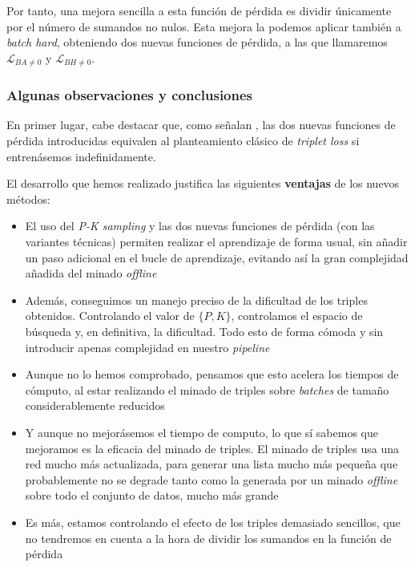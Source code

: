 Por tanto, una mejora sencilla a esta función de pérdida es dividir únicamente por el número de sumandos no nulos. Esta mejora la podemos aplicar también a \textit{batch hard}, obteniendo dos nuevas funciones de pérdida, a las que llamaremos $\mathcal{L}_{BA \neq 0}$ y $\mathcal{L}_{BH \neq 0}$.

\subsubsection{Algunas observaciones y conclusiones} \label{isubsubs:observaciones_conclusiones_pksampling}

En primer lugar, cabe destacar que, como señalan \cite{informatica:principal}, las dos nuevas funciones de pérdida introducidas equivalen al planteamiento clásico de \textit{triplet loss} si entrenásemos indefinidamente.

El desarrollo que hemos realizado justifica las siguientes \textbf{ventajas} de los nuevos métodos:

\begin{itemize}
    \item El uso del \textit{P-K sampling} y las dos nuevas funciones de pérdida (con las variantes técnicas) permiten realizar el aprendizaje de forma usual, sin añadir un paso adicional en el bucle de aprendizaje, evitando así la gran complejidad añadida del minado \textit{offline}
    \item Además, conseguimos un manejo preciso de la dificultad de los triples obtenidos. Controlando el valor de $\{P, K\}$, controlamos el espacio de búsqueda y, en definitiva, la dificultad. Todo esto de forma cómoda y sin introducir apenas complejidad en nuestro \textit{pipeline}
    \item Aunque no lo hemos comprobado, pensamos que esto acelera los tiempos de cómputo, al estar realizando el minado de triples sobre \textit{batches} de tamaño considerablemente reducidos
    \item Y aunque no mejorásemos el tiempo de computo, lo que sí sabemos que mejoramos es la eficacia del minado de triples. El minado de triples usa una red mucho más actualizada, para generar una lista mucho más pequeña que probablemente no se degrade tanto como la generada por un minado \textit{offline} sobre todo el conjunto de datos, mucho más grande
    \item Es más, estamos controlando el efecto de los triples demasiado sencillos, que no tendremos en cuenta a la hora de dividir los sumandos en la función de pérdida
\end{itemize}

